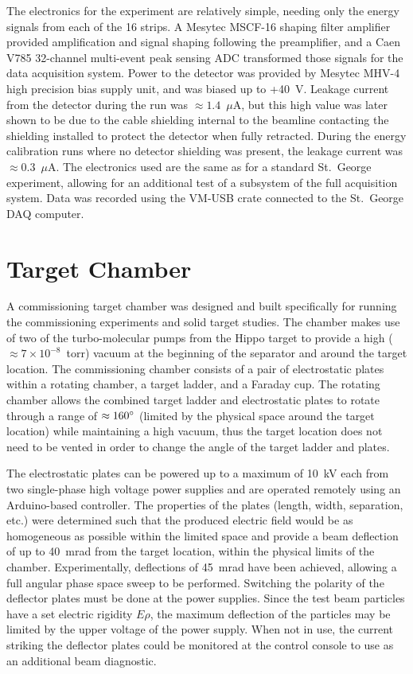 The electronics for the experiment are relatively simple, needing only
the energy signals from each of the 16 strips. A Mesytec MSCF-16 shaping
filter amplifier provided amplification and signal shaping following the
preamplifier, and a Caen V785 32-channel multi-event peak sensing ADC
transformed those signals for the data acquisition system. Power to the
detector was provided by Mesytec MHV-4 high precision bias supply unit,
and was biased up to +40~V. Leakage current from the detector during the
run was $\approx 1.4$~$\mu$A, but this high value was later shown to be
due to the cable shielding internal to the beamline contacting the
shielding installed to protect the detector when fully retracted. During
the energy calibration runs where no detector shielding was present, the
leakage current was $\approx 0.3$~$\mu$A. The electronics used are the
same as for a standard St.\ George experiment, allowing for an
additional test of a subsystem of the full acquisition system. Data was
recorded using the VM-USB crate connected to the St.\ George DAQ
computer.


\section{Target Chamber}
\label{sec:target}

A commissioning target chamber was designed and built specifically for
running the commissioning experiments and solid target studies. The
chamber makes use of two of the turbo-molecular pumps from the Hippo
target to provide a high ($\approx 7\times 10^{-8}$~torr) vacuum at the
beginning of the separator and around the target location. The
commissioning chamber consists of a pair of electrostatic plates within
a rotating chamber, a target ladder, and a Faraday cup. The rotating
chamber allows the combined target ladder and electrostatic plates to
rotate through a range of $\approx 160\degree$ (limited by the physical
space around the target location) while maintaining a high vacuum, thus
the target location does not need to be vented in order to change the
angle of the target ladder and plates.

The electrostatic plates can be powered up to a maximum of 10~kV each
from two single-phase high voltage power supplies and are operated
remotely using an Arduino-based controller. The properties of the plates
(length, width, separation, etc.) were determined such that the produced
electric field would be as homogeneous as possible within the limited
space and provide a beam deflection of up to 40~mrad from the target
location, within the physical limits of the chamber. Experimentally,
deflections of 45~mrad have been achieved, allowing a full angular phase
space sweep to be performed. Switching the polarity of the deflector
plates must be done at the power supplies. Since the test beam particles
have a set electric rigidity $E\rho$, the maximum deflection of the
particles may be limited by the upper voltage of the power supply. When
not in use, the current striking the deflector plates could be monitored
at the control console to use as an additional beam diagnostic.

